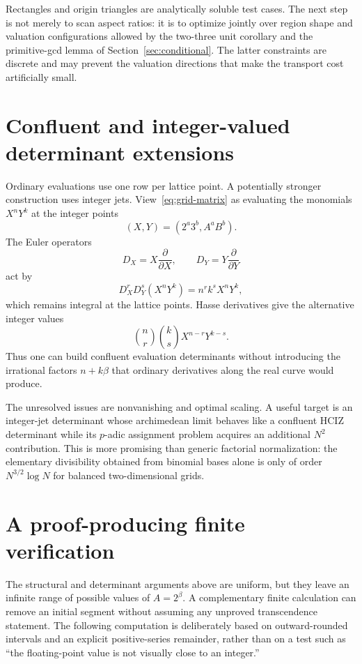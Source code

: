 \documentclass[11pt,oneside]{article}
\theoremstyle{definition}
\theoremstyle{remark}
\begin{document}
Rectangles and origin triangles are analytically soluble test cases.  The next
step is not merely to scan aspect ratios: it is to optimize jointly over region
shape and valuation configurations allowed by
the two-three unit corollary and the primitive-gcd lemma of
Section~\ref{sec:conditional}.  The latter
constraints are discrete and may prevent the valuation directions that make
the transport cost artificially small.

\section{Confluent and integer-valued determinant extensions}

Ordinary evaluations use one row per lattice point.  A potentially stronger
construction uses integer jets.  View~\eqref{eq:grid-matrix} as evaluating the
monomials $X^nY^k$ at the integer points
\[
 (X,Y)=(2^a3^b,A^aB^b).
\]
The Euler operators
\[
 D_X=X\frac{\partial}{\partial X},\qquad
 D_Y=Y\frac{\partial}{\partial Y}
\]
act by
\[
 D_X^rD_Y^s(X^nY^k)=n^rk^sX^nY^k,
\]
which remains integral at the lattice points.  Hasse derivatives give the
alternative integer values
\[
 \binom nr\binom ksX^{n-r}Y^{k-s}.
\]
Thus one can build confluent evaluation determinants without introducing the
irrational factors $n+k\beta$ that ordinary derivatives along the real curve
would produce.

The unresolved issues are nonvanishing and optimal scaling.  A useful target
is an integer-jet determinant whose archimedean limit behaves like a confluent
HCIZ determinant while its $p$-adic assignment problem acquires an additional
$N^2$ contribution.  This is more promising than generic factorial
normalization: the elementary divisibility obtained from binomial bases alone
is only of order $N^{3/2}\log N$ for balanced two-dimensional grids.

\section{A proof-producing finite verification}
\label{sec:finite-verification}

The structural and determinant arguments above are uniform, but they leave an
infinite range of possible values of $A=2^\beta$.  A complementary finite
calculation can remove an initial segment without assuming any unproved
transcendence statement.  The following computation is deliberately based on
outward-rounded intervals and an explicit positive-series remainder, rather
than on a test such as ``the floating-point value is not visually close to an
integer.''
\end{document}
